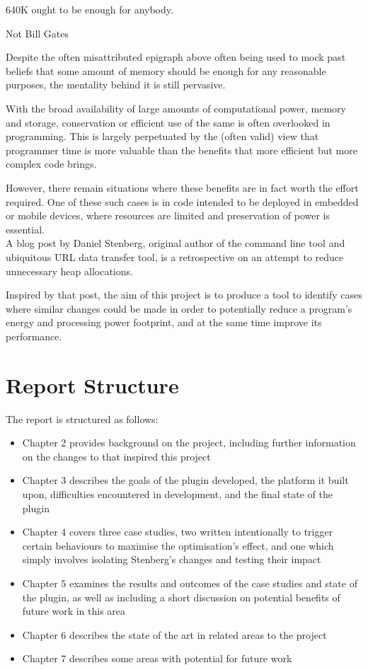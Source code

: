 \epigraph{640K ought to be enough for anybody.}{Not Bill Gates}

Despite the often misattributed epigraph above often being used to mock past beliefs that some amount of memory should be enough for any reasonable purposes, the mentality behind it is still pervasive.

With the broad availability of large amounts of computational power, memory and storage, conservation or efficient use of the same is often overlooked in programming. This is largely perpetuated by the (often valid) view that programmer time is more valuable than the benefits that more efficient but more complex code brings.

However, there remain situations where these benefits are in fact worth the effort required. One of these such cases is in code intended to be deployed in embedded or mobile devices, where resources are limited and preservation of power is essential. \\
A blog post \cite{curlmalloc} by Daniel Stenberg, original author of the  command line tool and ubiquitous URL data transfer tool, is a retrospective on an attempt to reduce unnecessary heap allocations.

Inspired by that post, the aim of this project is to produce a tool to identify cases where similar changes could be made in order to potentially reduce a program's energy and processing power footprint, and at the same time improve its performance.

\section{Report Structure}

The report is structured as follows:

\begin{itemize}
	\item{Chapter 2 provides background on the project, including further information on the changes to  that inspired this project}
	\item{Chapter 3 describes the goals of the plugin developed, the platform it built upon, difficulties encountered in development, and the final state of the plugin}
	\item{Chapter 4 covers three case studies, two written intentionally to trigger certain behaviours to maximise the optimisation's effect, and one which simply involves isolating Stenberg's changes and testing their impact}
	\item{Chapter 5 examines the results and outcomes of the case studies and state of the plugin, as well as including a short discussion on potential benefits of future work in this area}
	\item{Chapter 6 describes the state of the art in related areas to the project}
	\item{Chapter 7 describes some areas with potential for future work}
\end{itemize}
